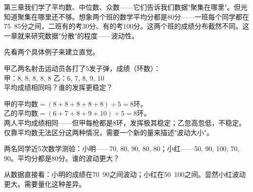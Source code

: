 
第三章我们学了平均数、中位数、众数——它们告诉我们数据"聚集在哪里"。但光知道聚集在哪里还不够。想象两个班的数学平均分都是80分——一班每个同学都在75~85分之间，二班有的考30分、有的考100分。这两个班的成绩分布截然不同。这一章就来研究数据"分散"的程度——波动性。


先看两个具体例子来建立直觉。

\begin{example}
甲乙两名射击运动员各打了5发子弹，成绩（环数）：\\
甲：8, 8, 8, 8, 8 \qquad 乙：6, 7, 8, 9, 10\\
平均成绩相同吗？谁的发挥更稳定？
\end{example}
\begin{solution}
甲的平均数$=(8+8+8+8+8)\div5=8$环。\\
乙的平均数$=(6+7+8+9+10)\div5=8$环。\\
两人平均成绩相同——但甲每枪都是8环，发挥极其稳定；乙忽高忽低，不稳定。仅靠平均数无法区分这两种情况，需要一个新的量来描述"波动大小"。
\end{solution}

\begin{center}
\end{center}

\begin{example}
两名同学近5次数学测验：小明——70, 80, 90, 80, 80；小红——50, 90, 100, 70, 90。平均分都是80分。谁的波动更大？
\end{example}
\begin{solution}
从数据直接看：小明的成绩在70~90之间波动；小红在50~100之间。显然小红波动更大。需要量化这种差异。
\end{solution}

